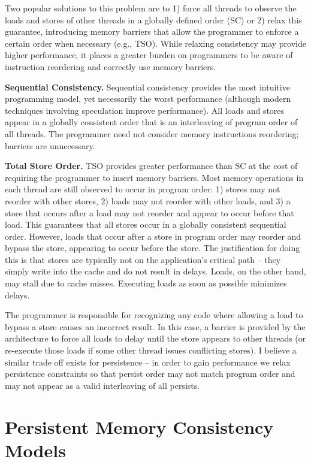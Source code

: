 Two popular solutions to this problem are to 1) force all threads to observe the loads and stores of other threads in a globally defined order (SC) or 2) relax this guarantee, introducing memory barriers that allow the programmer to enforce a certain order when necessary (e.g., TSO).
While relaxing consistency may provide higher performance, it places a greater burden on programmers to be aware of instruction reordering and correctly use memory barriers.

\textbf{Sequential Consistency.}
Sequential consistency provides the most intuitive programming model, yet necessarily the worst performance (although modern techniques involving speculation improve performance).
All loads and stores appear in a globally consistent order that is an interleaving of program order of all threads.
The programmer need not consider memory instructions reordering; barriers are unnecessary.

\textbf{Total Store Order.}
TSO provides greater performance than SC at the cost of requiring the programmer to insert memory barriers.
Most memory operations in each thread are still observed to occur in program order: 1) stores may not reorder with other stores, 2) loads may not reorder with other loads, and 3) a store that occurs after a load may not reorder and appear to occur before that load.
This guarantees that all stores occur in a globally consistent sequential order.
However, loads that occur after a store in program order may reorder and bypass the store, appearing to occur before the store.
The justification for doing this is that stores are typically not on the application's critical path -- they simply write into the cache and do not result in delays.
Loads, on the other hand, may stall due to cache misses.
Executing loads as soon as possible minimizes delays.

The programmer is responsible for recognizing any code where allowing a load to bypass a store causes an incorrect result.
In this case, a barrier is provided by the architecture to force all loads to delay until the store appears to other threads (or re-execute those loads if some other thread issues conflicting stores).
I believe a similar trade off exists for persistence -- in order to gain performance we relax persistence constraints so that persist order may not match program order and may not appear as a valid interleaving of all persists.

\section{Persistent Memory Consistency Models}
\label{sec:PMC:PersistenceModels}

